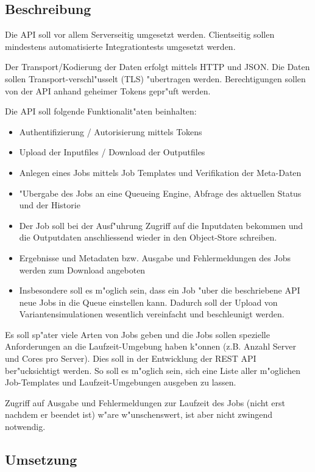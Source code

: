 \documentclass[12pt]{article}
\begin{document}
\subsection{Beschreibung}


Die API soll vor allem Serverseitig umgesetzt werden. Clientseitig sollen mindestens automatisierte Integrationtests umgesetzt werden.

Der Transport/Kodierung der Daten erfolgt mittels HTTP und JSON. Die Daten sollen Transport-verschl"usselt (TLS) "ubertragen werden. Berechtigungen sollen von der API anhand geheimer Tokens gepr"uft werden.

Die API soll folgende Funktionalit"aten beinhalten:

\begin{itemize}
\item Authentifizierung / Autorisierung mittels Tokens
\item Upload der Inputfiles / Download der Outputfiles
\item Anlegen eines Jobs mittels Job Templates und Verifikation der Meta-Daten
\item "Ubergabe des Jobs an eine Queueing Engine, Abfrage des aktuellen Status und der Historie
\item Der Job soll bei der Ausf"uhrung Zugriff auf die Inputdaten bekommen und die Outputdaten anschliessend wieder in den Object-Store schreiben.
\item Ergebnisse und Metadaten bzw. Ausgabe und Fehlermeldungen des Jobs werden zum Download angeboten
\item Insbesondere soll es m"oglich sein, dass ein Job "uber die beschriebene API neue Jobs in die Queue einstellen kann. Dadurch soll der Upload von Variantensimulationen wesentlich vereinfacht und beschleunigt werden.
\end{itemize}

Es soll sp"ater viele Arten von Jobs geben und die Jobs sollen spezielle Anforderungen an die Laufzeit-Umgebung haben k"onnen (z.B. Anzahl Server und Cores pro Server). Dies soll in der Entwicklung der REST API ber"ucksichtigt werden. So soll es m"oglich sein, sich eine Liste aller m"oglichen Job-Templates und Laufzeit-Umgebungen ausgeben zu lassen.

Zugriff auf Ausgabe und Fehlermeldungen zur Laufzeit des Jobs (nicht erst nachdem er beendet ist) w"are w"unschenswert, ist aber nicht zwingend notwendig.

\subsection{Umsetzung}
\end{document}
